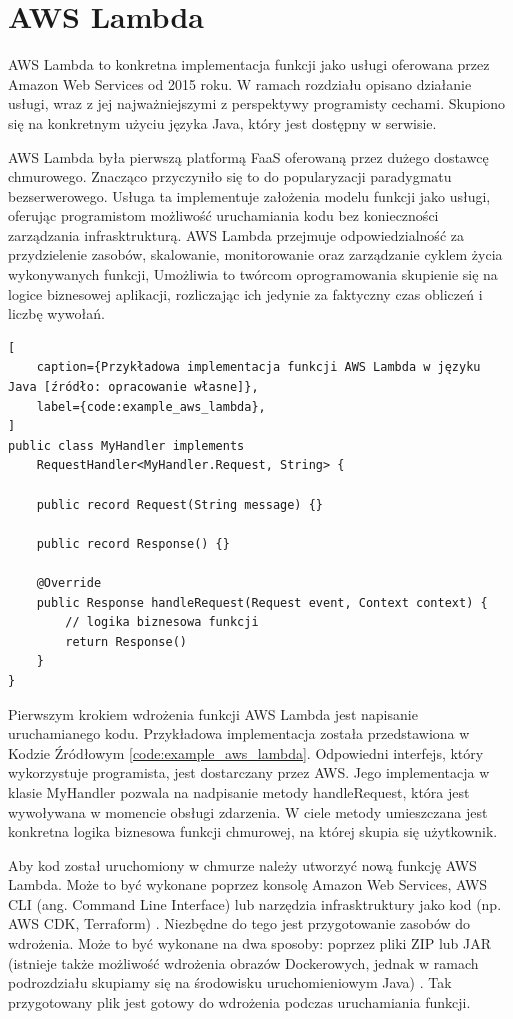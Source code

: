\section{AWS Lambda}\label{chapter:aws_lambda}

AWS Lambda to konkretna implementacja funkcji jako usługi oferowana przez Amazon Web Services od 2015 roku.
W ramach rozdziału opisano działanie usługi, wraz z jej najważniejszymi z perspektywy programisty cechami.
Skupiono się na konkretnym użyciu języka Java, który jest dostępny w serwisie.

AWS Lambda była pierwszą platformą FaaS oferowaną przez dużego dostawcę chmurowego.
Znacząco przyczyniło się to do popularyzacji paradygmatu bezserwerowego.
Usługa ta implementuje założenia modelu funkcji jako usługi, oferując programistom możliwość uruchamiania kodu bez konieczności zarządzania infrasktrukturą.
AWS Lambda przejmuje odpowiedzialność za przydzielenie zasobów, skalowanie, monitorowanie oraz zarządzanie cyklem życia wykonywanych funkcji,
Umożliwia to twórcom oprogramowania skupienie się na logice biznesowej aplikacji, rozliczając ich jedynie za faktyczny czas obliczeń i liczbę wywołań.

\begin{lstlisting}[
    caption={Przykładowa implementacja funkcji AWS Lambda w języku Java [źródło: opracowanie własne]}, 
    label={code:example_aws_lambda},
]
public class MyHandler implements 
    RequestHandler<MyHandler.Request, String> {
    
    public record Request(String message) {}

    public record Response() {}

    @Override
    public Response handleRequest(Request event, Context context) {
        // logika biznesowa funkcji
        return Response()
    }
}
\end{lstlisting}

Pierwszym krokiem wdrożenia funkcji AWS Lambda jest napisanie uruchamianego kodu.
Przykładowa implementacja została przedstawiona w Kodzie Źródłowym \ref{code:example_aws_lambda}. 
Odpowiedni interfejs, który wykorzystuje programista, jest dostarczany przez AWS.
Jego implementacja w klasie MyHandler pozwala na nadpisanie metody handleRequest, która jest wywoływana w momencie obsługi zdarzenia.
W ciele metody umieszczana jest konkretna logika biznesowa funkcji chmurowej, na której skupia się użytkownik.

Aby kod został uruchomiony w chmurze należy utworzyć nową funkcję AWS Lambda.
Może to być wykonane poprzez konsolę Amazon Web Services, AWS CLI (ang. Command Line Interface) lub narzędzia infrasktruktury jako kod (np. AWS CDK, Terraform) \cite{awsLambdaDocs}.
Niezbędne do tego jest przygotowanie zasobów do wdrożenia.
Może to być wykonane na dwa sposoby: poprzez pliki ZIP lub JAR (istnieje także możliwość wdrożenia obrazów Dockerowych, jednak w ramach podrozdziału skupiamy się na środowisku uruchomieniowym Java) \cite{awsLambdaDocs}.
Tak przygotowany plik jest gotowy do wdrożenia podczas uruchamiania funkcji.

